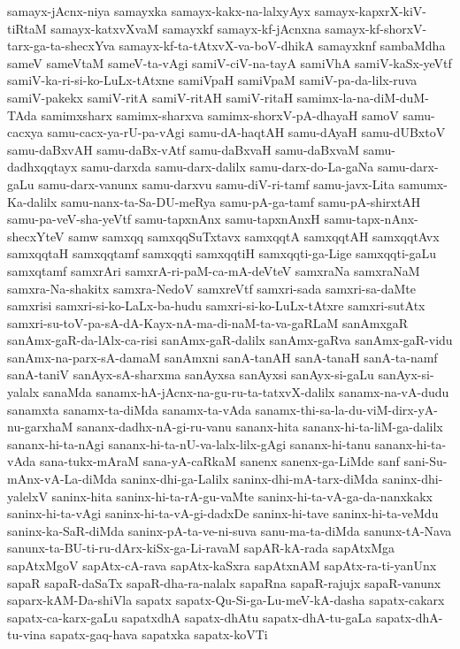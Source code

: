 {samayx-jAcnx-niya
samayxka
samayx-kakx-na-lalxyAyx
samayx-kapxrX-kiV-tiRtaM
samayx-katxvXvaM
samayxkf
samayx-kf-jAcnxna
samayx-kf-shorxV-tarx-ga-ta-shecxYva
samayx-kf-ta-tAtxvX-va-boV-dhikA
samayxknf
sambaMdha
sameV
sameVtaM
sameV-ta-vAgi
samiV-ciV-na-tayA
samiVhA
samiV-kaSx-yeVtf
samiV-ka-ri-si-ko-LuLx-tAtxne
samiVpaH
samiVpaM
samiV-pa-da-lilx-ruva
samiV-pakekx
samiV-ritA
samiV-ritAH
samiV-ritaH
samimx-la-na-diM-duM-TAda
samimxsharx
samimx-sharxva
samimx-shorxV-pA-dhayaH
samoV
samu-cacxya
samu-cacx-ya-rU-pa-vAgi
samu-dA-haqtAH
samu-dAyaH
samu-dUBxtoV
samu-daBxvAH
samu-daBx-vAtf
samu-daBxvaH
samu-daBxvaM
samu-dadhxqqtayx
samu-darxda
samu-darx-dalilx
samu-darx-do-La-gaNa
samu-darx-gaLu
samu-darx-vanunx
samu-darxvu
samu-diV-ri-tamf
samu-javx-Lita
samumx-Ka-dalilx
samu-nanx-ta-Sa-DU-meRya
samu-pA-ga-tamf
samu-pA-shirxtAH
samu-pa-veV-sha-yeVtf
samu-tapxnAnx
samu-tapxnAnxH
samu-tapx-nAnx-shecxYteV
samw
samxqq
samxqqSuTxtavx
samxqqtA
samxqqtAH
samxqqtAvx
samxqqtaH
samxqqtamf
samxqqti
samxqqtiH
samxqqti-ga-Lige
samxqqti-gaLu
samxqtamf
samxrAri
samxrA-ri-paM-ca-mA-deVteV
samxraNa
samxraNaM
samxra-Na-shakitx
samxra-NedoV
samxreVtf
samxri-sada
samxri-sa-daMte
samxrisi
samxri-si-ko-LaLx-ba-hudu
samxri-si-ko-LuLx-tAtxre
samxri-sutAtx
samxri-su-toV-pa-sA-dA-Kayx-nA-ma-di-naM-ta-va-gaRLaM
sanAmxgaR
sanAmx-gaR-da-lAlx-ca-risi
sanAmx-gaR-dalilx
sanAmx-gaRva
sanAmx-gaR-vidu
sanAmx-na-parx-sA-damaM
sanAmxni
sanA-tanAH
sanA-tanaH
sanA-ta-namf
sanA-taniV
sanAyx-sA-sharxma
sanAyxsa
sanAyxsi
sanAyx-si-gaLu
sanAyx-si-yalalx
sanaMda
sanamx-hA-jAcnx-na-gu-ru-ta-tatxvX-dalilx
sanamx-na-vA-dudu
sanamxta
sanamx-ta-diMda
sanamx-ta-vAda
sanamx-thi-sa-la-du-viM-dirx-yA-nu-garxhaM
sananx-dadhx-nA-gi-ru-vanu
sananx-hita
sananx-hi-ta-liM-ga-dalilx
sananx-hi-ta-nAgi
sananx-hi-ta-nU-va-lalx-lilx-gAgi
sananx-hi-tanu
sananx-hi-ta-vAda
sana-tukx-mAraM
sana-yA-caRkaM
sanenx
sanenx-ga-LiMde
sanf
sani-Su-mAnx-vA-La-diMda
saninx-dhi-ga-Lalilx
saninx-dhi-mA-tarx-diMda
saninx-dhi-yalelxV
saninx-hita
saninx-hi-ta-rA-gu-vaMte
saninx-hi-ta-vA-ga-da-nanxkakx
saninx-hi-ta-vAgi
saninx-hi-ta-vA-gi-dadxDe
saninx-hi-tave
saninx-hi-ta-veMdu
saninx-ka-SaR-diMda
saninx-pA-ta-ve-ni-suva
sanu-ma-ta-diMda
sanunx-tA-Nava
sanunx-ta-BU-ti-ru-dArx-kiSx-ga-Li-ravaM
sapAR-kA-rada
sapAtxMga
sapAtxMgoV
sapAtx-cA-rava
sapAtx-kaSxra
sapAtxnAM
sapAtx-ra-ti-yanUnx
sapaR
sapaR-daSaTx
sapaR-dha-ra-nalalx
sapaRna
sapaR-rajujx
sapaR-vanunx
saparx-kAM-Da-shiVla
sapatx
sapatx-Qu-Si-ga-Lu-meV-kA-dasha
sapatx-cakarx
sapatx-ca-karx-gaLu
sapatxdhA
sapatx-dhAtu
sapatx-dhA-tu-gaLa
sapatx-dhA-tu-vina
sapatx-gaq-hava
sapatxka
sapatx-koVTi
}
